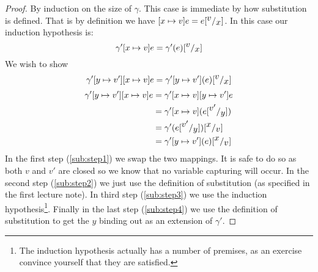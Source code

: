 \begin{proof}
  By induction on the size of $\gamma$.
  \case{$\gamma = \emptyset$} This case is immediate by how substitution is defined. That is by definition we have $[x \mapsto v] e = e[^{\textstyle v}/_{\textstyle x}]$.
   In this case our induction hypothesis is:
\[
  \gamma'[x \mapsto v] e = \gamma'(e)[^{\textstyle v}/_{\textstyle x}]
\]
We wish to show 
\[
  \gamma'[y \mapsto v'][x \mapsto v] e = \gamma'[y \mapsto v'](e)[^{\textstyle v}/_{\textstyle x}]
\]
\begin{align}
    \gamma'[y \mapsto v'][x \mapsto v] e & = \gamma'[x \mapsto v][y \mapsto v'] e \label{sub:step1}\\
                                         & = \gamma'[x \mapsto v] (e[^{\textstyle v'}/_{\textstyle y}]) \label{sub:step2}\\
                                         & = \gamma'(e[^{\textstyle v'}/_{\textstyle y}])[^{\textstyle x}/_{\textstyle v}]\label{sub:step3}\\
                                         & = \gamma'[y \mapsto v'](e)[^{\textstyle x}/_{\textstyle v}]\label{sub:step4}
\end{align}
In the first step (\ref{sub:step1}) we swap the two mappings. It is safe to do so as both $v$ and $v'$ are closed so we know that no variable capturing will occur. In the second step (\ref{sub:step2}) we just use the definition of substitution (as specified in the first lecture note). In third step (\ref{sub:step3}) we use the induction hypothesis\footnote{The induction hypothesis actually has a number of premises, as an exercise convince yourself that they are satisfied.}. Finally in the last step (\ref{sub:step4}) we use the definition of substitution to get the $y$ binding out as an extension of $\gamma'$.
\end{proof}
